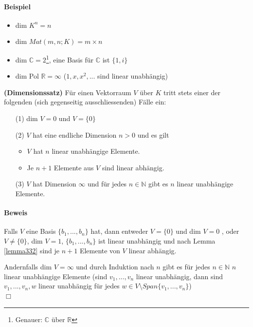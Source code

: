 \documentclass[11pt]{report}
\newcommand*\Zb[1] {\mathbb{#1}}
\newcommand*\f[1] {\textbf{#1}}
\begin{document}
\paragraph{Beispiel}
\begin{itemize}
 \item dim $K^n = n$
 \item dim $Mat(m, n; K) = m \times n$
 \item dim $\Zb{C} = 2$\footnote{Genauer: $\Zb{C}$ über $\Zb{R}$}, eine Basis für $\Zb{C}$ ist $\{1, i\}$
 \item dim Pol $\Zb{R} = \infty$ ($1, x, x^2, ...$ sind linear unabhängig)
\end{itemize}

\begin{satz} \f{(Dimensionssatz)}
 \label{satz343}
Für einen Vektorraum $V$ über $K$ tritt stets einer der folgenden (sich gegenseitig ausschliessenden) Fälle ein:
\begin{itemize}
 \item[(1)] dim $V = 0$ und $V = \{0\}$
 \item[(2)] $V$ hat eine endliche Dimension $n>0$ und es gilt 
\begin{itemize}
\item $V$ hat $n$ linear unabhängige Elemente.
\item Je $n+1$ Elemente aus $V$ sind linear abhängig.
\end{itemize}
 \item[(3)] $V$ hat Dimension $\infty$ und für jedes $n \in \Zb{N}$ gibt es $n$ linear unabhängige Elemente.
\end{itemize}
\end{satz}
\paragraph{Beweis}
Falls $V$ eine Basis $\{b_1, ..., b_n\}$ hat, dann entweder $V=\{0\}$ und dim $V = 0$
, oder $V \neq \{0\}$, dim $V=1$, $\{b_1, ...,  b_n\}$ ist linear unabhängig und nach Lemma \ref{lemma332} sind je $n+1$ Elemente von $V$ linear abhängig.

Andernfalls dim $V = \infty$ und durch Induktion nach $n$ gibt es für jedes $n \in \Zb{N}$ $n$ linear unabhängige Elemente (sind $v_1, ..., v_n$ linear unabhängig, dann sind $v_1, ..., v_n, w$ linear unabhängig für jedes $w \in V\setminus Span\{v_1, ..., v_n\}$) \\ \hspace*{1cm}\hfill $\Box$
\end{document}
